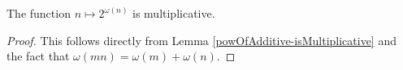 \begin{theorem}
\label{two_pow_omega_isMultiplicative}
\leanok
The function $n\mapsto 2^{\omega(n)}$ is multiplicative.
\end{theorem}
\begin{proof}
\leanok
This follows directly from Lemma \ref{powOfAdditive-isMultiplicative} and the fact that $\omega(mn)=\omega(m)+\omega(n)$.
\end{proof}
